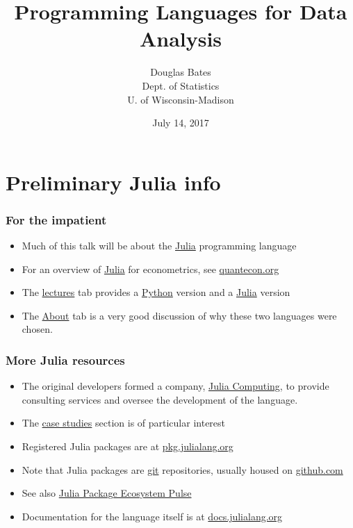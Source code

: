 \documentclass[pdf]{beamer}
\title{Programming Languages for Data Analysis}
\date{July 14, 2017}
\author{Douglas Bates\\Dept. of Statistics\\U. of Wisconsin-Madison}
\begin{document}
  \begin{frame}
    \maketitle
  \end{frame}

  \section{Preliminary Julia info}

  \begin{frame}\frametitle{For the impatient}
    \begin{itemize}
      \pause
      \item Much of this talk will be about the
      \href{https://julialang.org}{Julia} programming language
      \pause
      \item For an overview of \href{https:julialang.org}{Julia} for econometrics,
      see \href{https://quantecon.org}{quantecon.org}
      \pause
      \item The \href{https://lectures.quantecon.org/}{lectures} tab provides a
      \href{https://python.org}{Python} version and a
      \href{https://julialang.org}{Julia} version
      \pause
      \item The \href{https://lectures.quantecon.org/about_lectures.html}{About}
      tab is a very good discussion of why these two languages were
      chosen.
    \end{itemize}
  \end{frame}

  \begin{frame}\frametitle{More Julia resources}
    \begin{itemize}
      \pause
      \item The original developers formed a company,
      \href{https://juliacomputing.com}{Julia Computing}, to provide
      consulting services and oversee the development of the language.
      \pause
      \item The \href{https://juliacomputing.com/case-studies/}{case studies}
      section is of particular interest
      \pause
      \item Registered Julia packages are at
      \href{https://pkg.julialang.org}{pkg.julialang.org}
      \pause
      \item Note that Julia packages are
      \href{https://en.wikipedia.org/wiki/Git}{git} repositories, usually
      housed on \href{http://github.com}{github.com}
      \pause
      \item See also
      \href{https://pkg.julialang.org/pulse.html}{Julia Package Ecosystem Pulse}
      \pause
      \item Documentation for the language itself is at
      \href{https://docs.julialang.org}{docs.julialang.org}
    \end{itemize}
  \end{frame}
\end{document}
